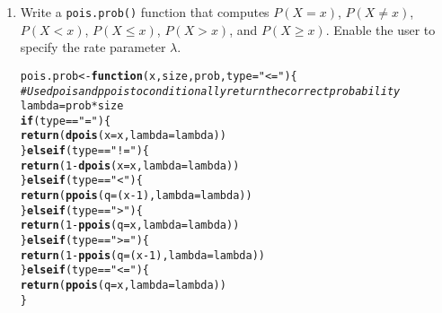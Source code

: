 \documentclass{article}\usepackage[]{graphicx}\usepackage[]{xcolor}
\makeatletter
\newcommand{\hlnum}[1]{\textcolor[rgb]{0.686,0.059,0.569}{#1}}%
\newcommand{\hlsng}[1]{\textcolor[rgb]{0.192,0.494,0.8}{#1}}%
\newcommand{\hlcom}[1]{\textcolor[rgb]{0.678,0.584,0.686}{\textit{#1}}}%
\newcommand{\hlopt}[1]{\textcolor[rgb]{0,0,0}{#1}}%
\newcommand{\hldef}[1]{\textcolor[rgb]{0.345,0.345,0.345}{#1}}%
\newcommand{\hlkwa}[1]{\textcolor[rgb]{0.161,0.373,0.58}{\textbf{#1}}}%
\newcommand{\hlkwb}[1]{\textcolor[rgb]{0.69,0.353,0.396}{#1}}%
\newcommand{\hlkwc}[1]{\textcolor[rgb]{0.333,0.667,0.333}{#1}}%
\newcommand{\hlkwd}[1]{\textcolor[rgb]{0.737,0.353,0.396}{\textbf{#1}}}%
\newenvironment{kframe}{%
 \def\at@end@of@kframe{}%
 \ifinner\ifhmode%
  \def\at@end@of@kframe{\end{minipage}}%
  \begin{minipage}{\columnwidth}%
 \fi\fi%
 \def\FrameCommand##1{\hskip\@totalleftmargin \hskip-\fboxsep
 \colorbox{shadecolor}{##1}\hskip-\fboxsep
     \hskip-\linewidth \hskip-\@totalleftmargin \hskip\columnwidth}%
 \MakeFramed {\advance\hsize-\width
   \@totalleftmargin\z@ \linewidth\hsize
   \@setminipage}}%
 {\par\unskip\endMakeFramed%
 \at@end@of@kframe}
\newenvironment{knitrout}{}{} %
\makeatother
\begin{document}
  \begin{enumerate}
    \item Write a \texttt{pois.prob()} function that computes $P(X=x)$, 
    $P(X \neq x)$, $P(X<x)$, $P(X \leq x)$, $P(X > x)$, and $P(X \geq x).$ Enable the user to specify the rate parameter $\lambda$.
\begin{knitrout}\scriptsize
{}\color{fgcolor}\begin{kframe}
\begin{alltt}
\hldef{pois.prob} \hlkwb{<-} \hlkwa{function}\hldef{(}\hlkwc{x}\hldef{,} \hlkwc{size}\hldef{,} \hlkwc{prob}\hldef{,} \hlkwc{type}\hldef{=}\hlsng{"<="}\hldef{)\{}
  \hlcom{# Use dpois and ppois to conditionally return the correct probability}
  \hldef{lambda} \hlkwb{=} \hldef{prob}\hlopt{*} \hldef{size}
  \hlkwa{if}\hldef{(type} \hlopt{==} \hlsng{"="}\hldef{)\{}
    \hlkwd{return}\hldef{(}\hlkwd{dpois}\hldef{(}\hlkwc{x}\hldef{=x,} \hlkwc{lambda} \hldef{= lambda))}
  \hldef{\}}\hlkwa{else if}\hldef{(type} \hlopt{==} \hlsng{"!="}\hldef{)\{}
    \hlkwd{return}\hldef{(}\hlnum{1} \hlopt{-} \hlkwd{dpois}\hldef{(}\hlkwc{x}\hldef{=x,} \hlkwc{lambda} \hldef{= lambda))}
  \hldef{\}}\hlkwa{else if}\hldef{(type} \hlopt{==} \hlsng{"<"}\hldef{)\{}
    \hlkwd{return}\hldef{(}\hlkwd{ppois}\hldef{(}\hlkwc{q}\hldef{=(x}\hlopt{-}\hlnum{1}\hldef{),} \hlkwc{lambda} \hldef{= lambda))}
  \hldef{\}}\hlkwa{else if}\hldef{(type} \hlopt{==} \hlsng{">"}\hldef{)\{}
    \hlkwd{return}\hldef{(}\hlnum{1} \hlopt{-} \hlkwd{ppois}\hldef{(}\hlkwc{q}\hldef{=x,} \hlkwc{lambda} \hldef{= lambda))}
  \hldef{\}}\hlkwa{else if}\hldef{(type} \hlopt{==} \hlsng{">="}\hldef{)\{}
    \hlkwd{return}\hldef{(}\hlnum{1} \hlopt{-} \hlkwd{ppois}\hldef{(}\hlkwc{q}\hldef{=(x}\hlopt{-}\hlnum{1}\hldef{),} \hlkwc{lambda} \hldef{= lambda))}
  \hldef{\}}\hlkwa{else if}\hldef{(type} \hlopt{==} \hlsng{"<="}\hldef{)\{}
    \hlkwd{return}\hldef{(}\hlkwd{ppois}\hldef{(}\hlkwc{q}\hldef{=x,} \hlkwc{lambda} \hldef{= lambda))}
  \hldef{\}}


\end{alltt}
\end{kframe}
\end{knitrout}
\end{enumerate}
\end{document}
